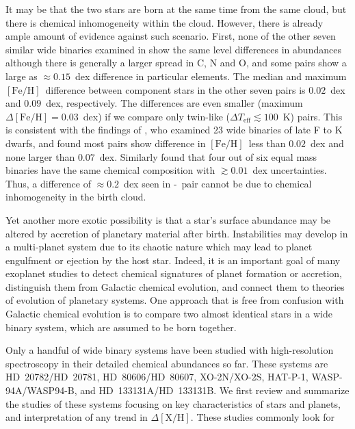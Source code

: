 \documentclass[manuscript]{aastex6}
\newcommand*\elem[1]{\ensuremath{\mathrm{#1}}}
\newcommand*\elemH[1]{\ensuremath{[\mathrm{#1}/\elem{H}]}}
\newcommand*{\feh}{\ensuremath{\elemH{Fe}}}
\newcommand{\sunanalog}{\text{Krios}}
\newcommand{\bizarreone}{\text{Kronos}}
\newcommand{\Tcondens}{\ensuremath{T_C}}
\begin{document}
It may be that the two stars are born at the same time from the same cloud, but
there is chemical inhomogeneity within the cloud.
However, there is already ample amount of evidence against such scenario.
First, none of the other seven similar wide binaries examined in
\citealt{2016ApJS..225...32B} show the same level differences in abundances
although there is generally a larger spread in $\elem{C}$, $\elem{N}$ and
$\elem{O}$, and some pairs show a large as $\approx 0.15$~dex difference in
particular elements.
The median and maximum \feh\ difference between component stars in the other
seven pairs is $0.02$~dex and $0.09$~dex, respectively.
The differences are even smaller (maximum $\Delta\feh = 0.03$~dex)
if we compare only twin-like ($\Delta T_\mathrm{eff} \lesssim 100$~K) pairs.
This is consistent with the findings of \citealt{Desidera:2004aa}, who examined
23 wide binaries of late F to K dwarfs, and found most pairs show difference in
\feh\ less than $0.02$~dex and none larger than $0.07$~dex.
Similarly \citealt{Gratton:2001aa} found that four out of six equal mass binaries
have the same chemical composition with $\gtrsim 0.01$~dex uncertainties.
Thus, a difference of $\approx 0.2$~dex seen in \bizarreone-\sunanalog\ pair
cannot be due to chemical inhomogeneity in the birth cloud.

Yet another more exotic possibility is that a star's surface abundance may
be altered by accretion of planetary material after birth.
Instabilities may develop in a multi-planet system due to its chaotic nature
which may lead to planet engulfment or ejection by the host star.
Indeed, it is an important goal of many exoplanet studies
to detect chemical signatures of planet formation or accretion,
distinguish them from Galactic chemical evolution, and
connect them to theories of evolution of planetary systems.
One approach that is free from confusion with Galactic chemical evolution
is to compare two almost identical stars in a wide binary system,
which are assumed to be born together.


Only a handful of wide binary systems have been studied with high-resolution
spectroscopy in their detailed chemical abundances so far.
These systems are HD~20782/HD~20781, HD~80606/HD~80607, XO-2N/XO-2S, HAT-P-1,
WASP-94A/WASP94-B, and HD~133131A/HD~133131B.
We first review and summarize the studies of these systems focusing on key
characteristics of stars and planets, and interpretation of any trend in
$\Delta\elemH{X}$.
These studies commonly look for
\end{document}
